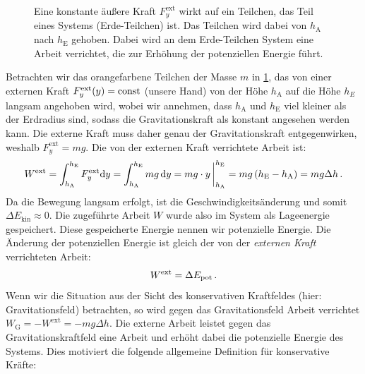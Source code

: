 \begin{figure}[htb]
{
    }
    \caption{Eine konstante äußere Kraft $F_y^{\text{ext}}$ wirkt auf ein Teilchen, das Teil eines Systems (Erde-Teilchen) ist. Das Teilchen wird dabei von $h_\text{A}$ nach $h_\text{E}$ gehoben. Dabei wird an dem Erde-Teilchen System eine Arbeit verrichtet, die zur Erhöhung der potenziellen Energie führt.}\label{fig: lageenergie_erde_teilchen}
\end{figure}

Betrachten wir das orangefarbene Teilchen der Masse $m$ in \cref{fig: lageenergie_erde_teilchen}, das von einer externen Kraft $F_{y}^{\text{ext}}(y) = \mathrm{const}$ (\zB unsere Hand) von der Höhe $h_{\text{A}}$ auf die Höhe $h_E$ langsam angehoben wird, wobei wir annehmen, dass $h_\text{A}$ und $h_\text{E}$ viel kleiner als der Erdradius sind, sodass die Gravitationskraft als konstant angesehen werden kann. Die externe Kraft muss daher genau der Gravitationskraft entgegenwirken, weshalb $F_y^{\text{ext}} = mg$. Die von der externen Kraft verrichtete Arbeit ist:
\begin{equation}
    W^{\text{ext}} = \int_{h_{\text{A}}}^{h_{\text{E}}} F_y^{\text{ext}} \mathrm{d} y = \int_{h_{\text{A}}}^{h_{\text{E}}} mg\, \mathrm{d} y = mg\cdot y \,\bigg|_{h_{\text{A}}}^{h_{\text{E}}} = mg \left( h_{\text{E}} - h_{\text{A}} \right) = mg \Delta h\,.
\end{equation}
Da die Bewegung langsam erfolgt, ist die Geschwindigkeitsänderung und somit $\Delta E_{\text{kin}} \approx 0$. Die zugeführte Arbeit $W$ wurde also im System als Lageenergie gespeichert. Diese gespeicherte Energie nennen wir potenzielle Energie. Die Änderung der potenziellen Energie ist gleich der von der \textit{externen Kraft} verrichteten Arbeit:
\begin{equation}
    W^{\text{ext}} = \Delta E_{\text{pot}} \,.
\end{equation}
Wenn wir die Situation aus der Sicht des konservativen Kraftfeldes (hier: Gravitationsfeld) betrachten, so wird gegen das Gravitationsfeld Arbeit verrichtet $W_{\text{G}} = -W^{\text{ext}} = -mg \Delta h$. Die externe Arbeit leistet gegen das Gravitationskraftfeld eine Arbeit und erhöht dabei die potenzielle Energie des Systems. Dies motiviert die folgende allgemeine Definition für konservative Kräfte:
